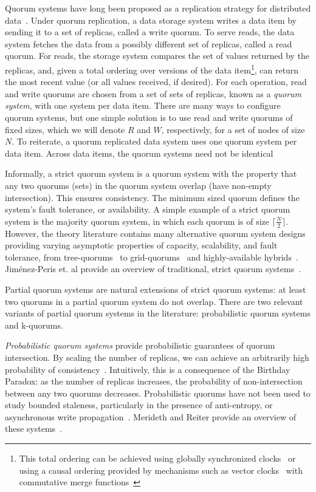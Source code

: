 \documentclass{vldb}
\begin{document}
Quorum systems have long been proposed as a replication strategy for
distributed data~\cite{quorums-start}.  Under quorum replication, a
data storage system writes a data item by sending it to a set of
replicas, called a write quorum.  To serve reads, the data system
fetches the data from a possibly different set of replicas, called a
read quorum.  For reads, the storage system compares the set of values
returned by the replicas, and, given a total ordering over versions of
the data item\footnote{This total ordering can be achieved using
  globally synchronized clocks~\cite{synch-clocks} or using a causal
  ordering provided by mechanisms such as vector
  clocks~\cite{vectorclock} with commutative merge
  functions~\cite{cops}}, can return the most recent value (or all
values received, if desired).  For each operation, read and write
quorums are chosen from a set of sets of replicas, known as a
\textit{quorum system}, with one system per data item.  There are many
ways to configure quorum systems, but one simple solution is to use
read and write quorums of fixed sizes, which we will denote $R$ and
$W$, respectively, for a set of nodes of size $N$.  To reiterate, a
quorum replicated data system uses one quorum system per data item.
Across data items, the quorum systems need not be identical

Informally, a strict quorum system is a quorum system with the
property that any two quorums (sets) in the quorum system overlap
(have non-empty intersection). This ensures consistency.  The minimum
sized quorum defines the system's fault tolerance, or availability.  A
simple example of a strict quorum system is the majority quorum
system, in which each quorum is of size $\lceil \frac{N}{2}\rceil$.
However, the theory literature contains many alternative quorum system
designs providing varying asymptotic properties of capacity,
scalability, and fault tolerance, from tree-quorums~\cite{treequorum}
to grid-quorums~\cite{quorumsystems} and highly-available
hybrids~\cite{92-quorums}.  Jim\'{e}nez-Peris et. al provide an
overview of traditional, strict quorum
systems~\cite{quorums-alternative}.

Partial quorum systems are natural extensions of strict quorum
systems: at least two quorums in a partial quorum system do not
overlap.  There are two relevant variants of partial quorum systems in
the literature: probabilistic quorum systems and k-quorums.

\textit{Probabilistic quorum systems} provide probabilistic guarantees
of quorum intersection.  By scaling the number of replicas, we can
achieve an arbitrarily high probability of
consistency~\cite{prob-quorum}.  Intuitively, this is a consequence of
the Birthday Paradox: as the number of replicas increases, the
probability of non-intersection between any two quorums decreases.
Probabilistic quorums have not been used to study bounded staleness,
particularly in the presence of anti-entropy, or asynchronous write
propagation~\cite{antientropy}.  Merideth and Reiter provide an
overview of these systems~\cite{quorum-overview}.
\end{document}
